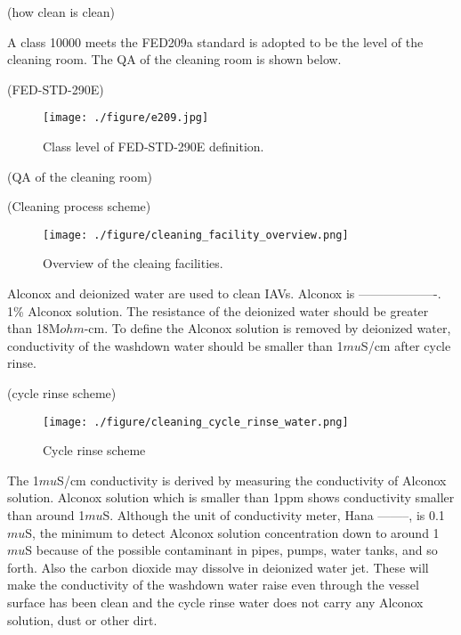 (how clean is clean)



A class 10000 meets the FED209a standard is adopted to be the level of the cleaning room.
The QA of the cleaning room is shown below.


(FED-STD-290E)

\begin{figure}[h]
    \centering
    \texttt{[image: ./figure/e209.jpg]}
    \caption{Class level of FED-STD-290E definition.}
    \label{e209.jpg}
    \end{figure}





(QA of the cleaning room)




(Cleaning process scheme)
\begin{figure}[h]
    \centering
    \texttt{[image: ./figure/cleaning\_facility\_overview.png]}
    \caption{Overview of the cleaing facilities.}
    \label{cleaning_facility_overview.png}
    \end{figure}

Alconox and deionized water are used to clean IAVs. Alconox is -------------------.
1\% Alconox solution.
The resistance of the deionized water should be greater than 18M$ohm$-cm.
To define the Alconox solution is removed by deionized water, conductivity of the
washdown water should be smaller than 1$mu$S/cm after cycle rinse.


(cycle rinse scheme)
\begin{figure}[h]
    \centering
    \texttt{[image: ./figure/cleaning\_cycle\_rinse\_water.png]}
    \caption{Cycle rinse scheme}
    \label{cleaning_cycle_rinse_water.png}
    \end{figure}

The 1$mu$S/cm conductivity is derived by measuring the conductivity of Alconox solution.
Alconox solution which is smaller than 1ppm shows conductivity smaller than around 1$mu$S.
Although the unit of conductivity meter, Hana --------, is 0.1 $mu$S, the minimum to detect
Alconox solution concentration down to around 1$mu$S because of the possible contaminant
in pipes, pumps, water tanks, and so forth. Also the carbon dioxide may dissolve in
deionized water jet. These will make the conductivity of the washdown water raise
even through the vessel surface has been clean and the cycle rinse water does not
carry any Alconox solution, dust or other dirt.


